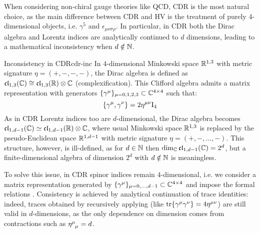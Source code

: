 When considering non-chiral gauge theories like QCD, CDR is the most natural choice, as the main difference between CDR and HV is the treatment of purely $ 4 $-dimensional objects, i.e. $ \gamma^5 $ and $ \epsilon_{\mu \nu \sigma \rho} $. In particular, in CDR both the Dirac algebra and Lorentz indices are analytically continued to $ d $ dimensions, leading to a mathematical inconsistency when $ d \notin \mathbb{N} $.

\begin{observation}{Inconsistency in CDR}{cdr-inc}
  In $ 4 $-dimensional Minkowski space $ \mathbb{R}^{1,3} $ with metric signature $ \eta = (+,-,-,-) $, the Dirac algebra is defined as $ \mathfrak{cl}_{1,3}(\mathbb{C}) \cong \mathfrak{cl}_{1,3}(\mathbb{R}) \otimes \mathbb{C} $ (complexification\footnotemark). This Clifford algebra admits a matrix representation with generators $ \{\gamma^\mu\}_{\mu = 0, 1, 2, 3} \subset \mathbb{C}^{4 \times 4} $ such that:
  \begin{equation}
    \{\gamma^\mu , \gamma^\nu\} = 2 \eta^{\mu \nu} \mathrm{I}_4
    \label{eq:dir-alg}
  \end{equation}
  As in CDR Lorentz indices too are $ d $-dimensional, the Dirac algebra becomes $ \mathfrak{cl}_{1,d-1}(\mathbb{C}) \simeq \mathfrak{cl}_{1,d-1}(\mathbb{R}) \otimes \mathbb{C} $, where usual Minkowski space $ \mathbb{R}^{1,3} $ is replaced by the pseudo-Euclidean space $ \mathbb{R}^{1,d-1} $ with metric signature $ \eta = (+,-,\dots,-) $. This structure, however, is ill-defined, as for $ d \in \mathbb{N} $ then $ \dim_{\mathbb{C}} \mathfrak{cl}_{1,d-1}(\mathbb{C}) = 2^d $, but a finite-dimensional algebra of dimension $ 2^d $ with $ d \notin \mathbb{N} $ is meaningless.

  To solve this issue, in CDR spinor indices remain $ 4 $-dimensional, i.e. we consider a matrix representation generated by $ \{\gamma^\mu\}_{\mu = 0, \dots, d-1} \subset \mathbb{C}^{4 \times 4} $ and impose the formal relations . Consistency is achieved by analytical continuation of trace identities: indeed, traces obtained by recursively applying  (like $ \operatorname{tr}\{\gamma^\mu \gamma^\nu\} = 4 \eta^{\mu \nu} $) are still valid in $ d $-dimensions, as the only dependence on dimension comes from contractions such as $ \tensor{\eta}{^\mu_\mu} = d $.


\end{observation}
